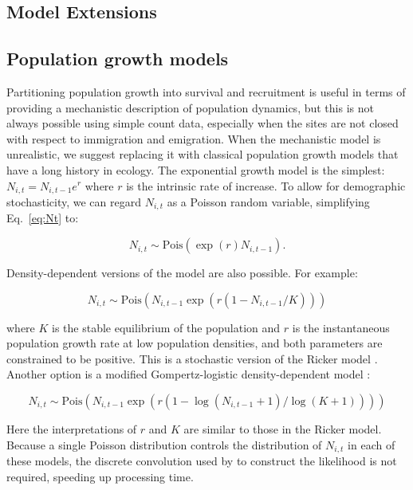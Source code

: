 \documentclass[12pt,english]{article}
\begin{document}
\begin{spacing}{1.9}
\begin{flushleft}
\section*{Model Extensions}
\label{sec:ext}
\subsection*{Population growth models}
Partitioning population growth into survival and recruitment
is useful  
in terms of providing a mechanistic description of population
dynamics, but this is not always possible using simple count data,
especially when the sites are not closed with respect to immigration
and emigration. 
When the mechanistic model is unrealistic, we suggest replacing it
with classical population growth models that have a long history in ecology.
The exponential growth model is the simplest: %
$N_{i,t} = N_{i,t-1}e^r$ where $r$ is the intrinsic
rate of increase. 
To allow for demographic stochasticity, we can regard $N_{i,t}$ as a Poisson 
random variable, simplifying Eq.~\ref{eq:Nt} to:
\begin{linenomath*}
\begin{equation}
  N_{i,t} \sim \mathrm{Pois}(\exp(r)N_{i,t-1}).
\label{eq:exp}
\end{equation}
\end{linenomath*}

Density-dependent versions of the model are also possible.  For
example:
\begin{linenomath*}
\begin{equation}
  N_{i,t} \sim \mathrm{Pois}(N_{i,t-1}\exp(r(1-N_{i,t-1}/K)))
\label{eq:rick}
\end{equation}
\end{linenomath*}
where $K$ is the stable equilibrium of the population and $r$ is
the instantaneous population growth rate at low population
densities, and both parameters are constrained to be positive. This is
a stochastic version of the 
Ricker model \citep{ricker:1954}. Another option is a 
modified Gompertz-logistic
density-dependent model \citep[henceforth Gompertz model,][]{hart_gotelli:2011}:
\begin{linenomath*}
\begin{equation}
N_{i,t} \sim \mathrm{Pois}(N_{i,t-1}\exp(r(1-\log(N_{i,t-1}+1)/\log(K+1))))
\label{eq:gomp}
\end{equation}
\end{linenomath*}
Here the interpretations of $r$ and $K$ are similar to those in the
Ricker model. Because a single Poisson distribution controls
the distribution of $N_{i,t}$ in each of these models, the discrete 
convolution used by \citet{dail_madsen:2011} to construct the
likelihood is not required, speeding up processing time.



\end{flushleft}
\end{spacing}
\end{document}

